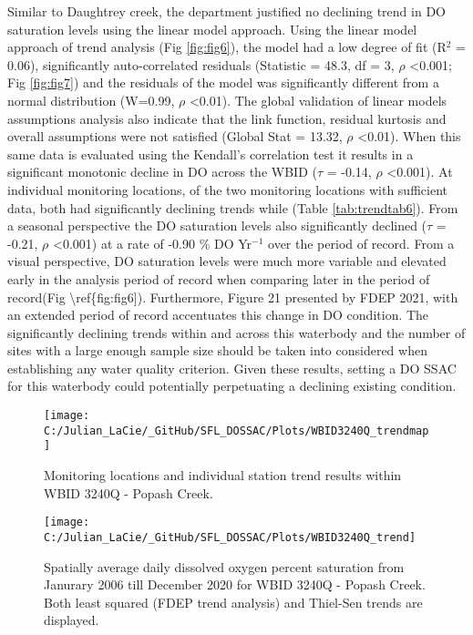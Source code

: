 \documentclass[]{interact}
\theoremstyle{plain}%
\theoremstyle{definition}
\theoremstyle{remark}
\begin{document}
Similar to Daughtrey creek, the department justified no declining trend
in DO saturation levels using the linear model approach. Using the
linear model approach of trend analysis (Fig \ref{fig:fig6}), the model
had a low degree of fit (R\(^{2}\) = 0.06), significantly
auto-correlated residuals (Statistic = 48.3, df = 3, \(\rho\)
\textless0.001; Fig \ref{fig:fig7}) and the residuals of the model was
significantly different from a normal distribution (W=0.99, \(\rho\)
\textless0.01). The global validation of linear models assumptions
analysis also indicate that the link function, residual kurtosis and
overall assumptions were not satisfied (Global Stat = 13.32, \(\rho\)
\textless0.01). When this same data is evaluated using the Kendall's
correlation test it results in a significant monotonic decline in DO
across the WBID (\(\tau\) = -0.14, \(\rho\) \textless0.001). At
individual monitoring locations, of the two monitoring locations with
sufficient data, both had significantly declining trends while (Table
\ref{tab:trendtab6}). From a seasonal perspective the DO saturation
levels also significantly declined (\(\tau\) = -0.21, \(\rho\)
\textless0.001) at a rate of -0.90 \% DO Yr\(^{-1}\) over the period of
record. From a visual perspective, DO saturation levels were much more
variable and elevated early in the analysis period of record when
comparing later in the period of record(Fig
\textbackslash ref\{fig:fig6{]}). Furthermore, Figure 21 presented by
FDEP 2021, with an extended period of record accentuates this change in
DO condition. The significantly declining trends within and across this
waterbody and the number of sites with a large enough sample size should
be taken into considered when establishing any water quality criterion.
Given these results, setting a DO SSAC for this waterbody could
potentially perpetuating a declining existing condition.

\begin{figure}[H]

{\centering \texttt{[image: C:/Julian\_LaCie/\_GitHub/SFL\_DOSSAC/Plots/WBID3240Q\_trendmap]} 

}

\caption{\label{fig:mapfig5} Monitoring locations and individual station trend results within WBID 3240Q - Popash Creek.}\label{fig:unnamed-chunk-9}
\end{figure}

\begin{figure}[H]

{\centering \texttt{[image: C:/Julian\_LaCie/\_GitHub/SFL\_DOSSAC/Plots/WBID3240Q\_trend]} 

}

\caption{\label{fig:fig6} Spatially average daily dissolved oxygen percent saturation from Janurary 2006 till December 2020 for  WBID 3240Q - Popash Creek. Both least squared (FDEP trend analysis) and Thiel-Sen trends are displayed.}\label{fig:unnamed-chunk-10}
\end{figure}
\end{document}

